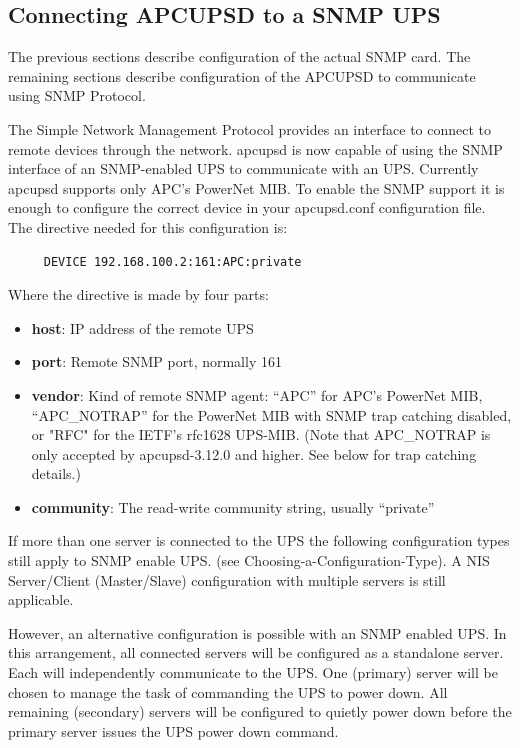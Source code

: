 {{{{{{{\subsection*{Connecting APCUPSD to a SNMP UPS}

\label{index-SNMP_002c-Connecting-163}

The previous sections describe configuration of the actual SNMP card.
The remaining sections describe configuration of the APCUPSD to communicate
using SNMP Protocol.


The Simple Network Management Protocol provides an interface to connect to
remote devices through the network. apcupsd is now capable of using the SNMP
interface of an SNMP-enabled UPS to communicate with an UPS. Currently apcupsd
supports only APC's PowerNet MIB. To enable the SNMP support it is enough to
configure the correct device in your apcupsd.conf configuration file. The
directive needed for this configuration is: 

\footnotesize
\begin{verbatim}
     DEVICE 192.168.100.2:161:APC:private
\end{verbatim}
\normalsize

Where the directive is made by four parts:  

\begin{itemize}
\item {\bf host}: IP address of the remote UPS  
\item {\bf port}: Remote SNMP port, normally 161
\item {\bf vendor}: Kind of remote SNMP agent: ``APC'' for APC's PowerNet MIB, 
``APC\_NOTRAP'' for the PowerNet MIB with SNMP trap catching disabled, or "RFC"
for the IETF's rfc1628 UPS-MIB. (Note that APC\_NOTRAP is only accepted by 
apcupsd-3.12.0 and higher. See below for trap catching details.)
\item {\bf community}: The read-write community string, usually ``private''
\end{itemize}


If more than one server is connected to the UPS the following configuration
types still apply to SNMP enable UPS. (see 
{Choosing-a-Configuration-Type}).  A NIS Server/Client (Master/Slave) configuration
with multiple servers is still applicable.
 
However, an alternative configuration is possible with an SNMP enabled UPS.  In
this arrangement, all connected servers will be configured as a standalone server.
Each will independently communicate to the UPS.  One (primary) server will be 
chosen to manage the task of commanding the UPS to power down. All remaining
(secondary) servers will be configured to quietly power down before the
primary server issues the UPS power down command. 

}}}}}}}
